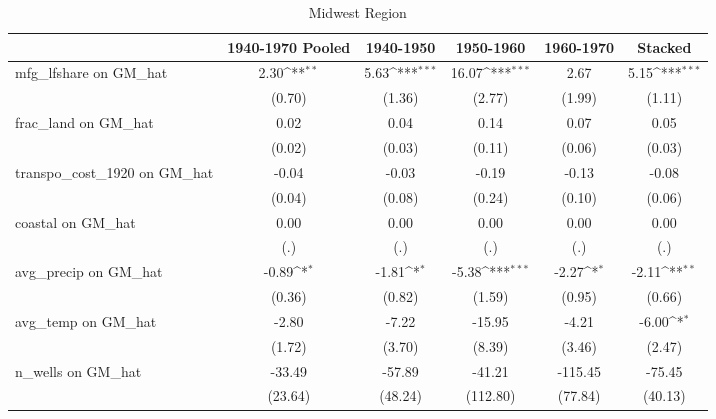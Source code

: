 \begin{table}[htbp]\centering
\def\sym#1{\ifmmode^{#1}\else\(^{#1}\)\fi}
\caption{Midwest Region}
\begin{tabular}{l*{5}{c}}
\toprule
                &\multicolumn{1}{c}{1940-1970 Pooled}&\multicolumn{1}{c}{1940-1950}&\multicolumn{1}{c}{1950-1960}&\multicolumn{1}{c}{1960-1970}&\multicolumn{1}{c}{Stacked}\\
\midrule
mfg\_lfshare on GM\_hat&     2.30\sym{**} &     5.63\sym{***}&    16.07\sym{***}&     2.67         &     5.15\sym{***}\\
                &   (0.70)         &   (1.36)         &   (2.77)         &   (1.99)         &   (1.11)         \\
\addlinespace
frac\_land on GM\_hat&     0.02         &     0.04         &     0.14         &     0.07         &     0.05         \\
                &   (0.02)         &   (0.03)         &   (0.11)         &   (0.06)         &   (0.03)         \\
\addlinespace
transpo\_cost\_1920 on GM\_hat&    -0.04         &    -0.03         &    -0.19         &    -0.13         &    -0.08         \\
                &   (0.04)         &   (0.08)         &   (0.24)         &   (0.10)         &   (0.06)         \\
\addlinespace
coastal on GM\_hat&     0.00         &     0.00         &     0.00         &     0.00         &     0.00         \\
                &      (.)         &      (.)         &      (.)         &      (.)         &      (.)         \\
\addlinespace
avg\_precip on GM\_hat&    -0.89\sym{*}  &    -1.81\sym{*}  &    -5.38\sym{***}&    -2.27\sym{*}  &    -2.11\sym{**} \\
                &   (0.36)         &   (0.82)         &   (1.59)         &   (0.95)         &   (0.66)         \\
\addlinespace
avg\_temp on GM\_hat&    -2.80         &    -7.22         &   -15.95         &    -4.21         &    -6.00\sym{*}  \\
                &   (1.72)         &   (3.70)         &   (8.39)         &   (3.46)         &   (2.47)         \\
\addlinespace
n\_wells on GM\_hat&   -33.49         &   -57.89         &   -41.21         &  -115.45         &   -75.45         \\
                &  (23.64)         &  (48.24)         & (112.80)         &  (77.84)         &  (40.13)         \\

\end{tabular}
\end{table}

